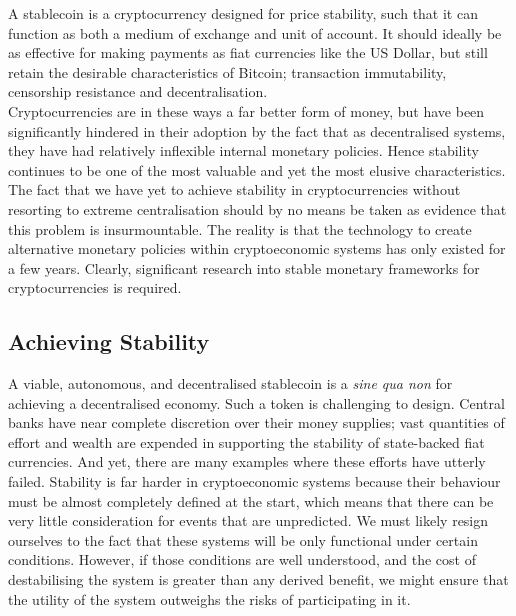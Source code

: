 \noindent A stablecoin is a cryptocurrency designed for price stability, such that it can function as
both a medium of exchange and unit of account. It should ideally be as effective for making payments
as fiat currencies like the US Dollar, but still retain the desirable characteristics of Bitcoin;
transaction immutability, censorship resistance and decentralisation. \\

\noindent Cryptocurrencies are in these ways a far better form of money, but have been significantly hindered
in their adoption by the fact that as decentralised systems, they have had relatively inflexible internal
monetary policies. Hence stability continues to be one of the most valuable and yet the most elusive
characteristics.
The fact that we have yet to achieve stability in cryptocurrencies without resorting to extreme
centralisation should by no means be taken as evidence that this problem is insurmountable.
The reality is that the technology to create alternative monetary policies within
cryptoeconomic systems has only existed for a few years. Clearly, significant research into stable monetary
frameworks for cryptocurrencies is required. \\

\subsection{Achieving Stability}

\noindent A viable, autonomous, and decentralised stablecoin is a \textit{sine qua non} for achieving a decentralised
economy.
Such a token is challenging to design. Central banks have near complete discretion over their money supplies;
vast quantities of effort and wealth are expended in supporting the stability of state-backed fiat currencies.
And yet, there are many examples where these efforts have utterly failed.
Stability is far harder in cryptoeconomic systems because their behaviour must be almost completely
defined at the start, which means that there can be very little consideration for events that are unpredicted.
We must likely resign ourselves to the fact that these systems will be only functional under certain conditions.
However, if those conditions are well understood, and the cost of destabilising the system is greater than
any derived benefit, we might ensure that the utility of the system outweighs the risks of participating in it. \\

